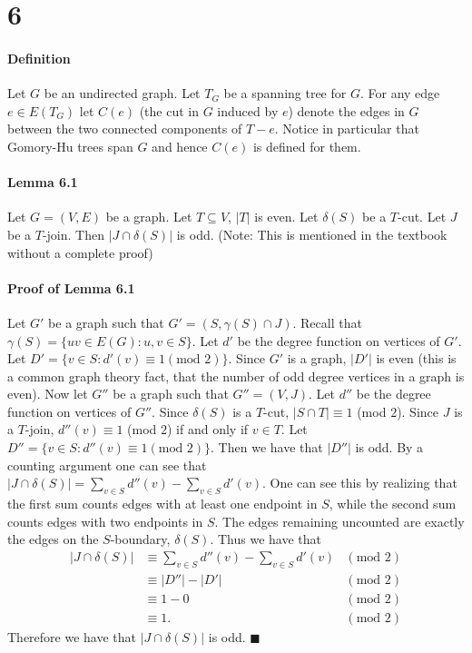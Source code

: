 \documentclass[letterpaper,12pt,oneside,onecolumn]{article}
\begin{document}
\section*{6}
\paragraph{Definition}
Let $G$ be an undirected graph. Let $T_G$ be a spanning tree for $G$.  For any edge $e \in E(T_G)$ let $C(e)$ (the cut in $G$ induced by $e$) denote the edges in $G$ between the two connected components of $T-e$. Notice in particular that Gomory-Hu trees span $G$ and hence $C(e)$ is defined for them.
\paragraph{Lemma 6.1}
Let $G=(V,E)$ be a graph. Let $T \subseteq V$, $|T|$ is even. Let $\delta(S)$ be a $T$-cut. Let $J$ be a $T$-join. Then $|J \cap \delta(S)|$ is odd. (Note: This is mentioned in the textbook without a complete proof)
\paragraph{Proof of Lemma 6.1}
Let $G'$ be a graph such that $G' = (S, \gamma(S) \cap J)$. Recall that $\gamma(S) = \{ uv \in E(G) : u, v \in S\}$. Let $d'$ be the degree function on vertices of $G'$. Let $D' = \{ v \in S : d'(v) \equiv 1 (\text{mod }2)\}$. Since $G'$ is a graph, $|D'|$ is even (this is a common graph theory fact, that the number of odd degree vertices in a graph is even). Now let $G''$ be a graph such that $G'' = (V, J)$. Let $d''$ be the degree function on vertices of $G''$. Since $\delta(S)$ is a $T$-cut, $|S \cap T| \equiv 1$ (mod $2$). Since $J$ is a $T$-join, $d''(v) \equiv 1$ (mod $2$) if and only if $v \in T$. Let $D'' = \{v \in S : d''(v) \equiv 1 (\text{mod }2)\}$. Then we have that $|D''|$ is odd. By a counting argument one can see that $|J \cap \delta(S)| = \sum_{v \in S} d''(v) - \sum_{v \in S} d'(v)$. One can see this by realizing that the first sum counts edges with at least one endpoint in $S$, while the second sum counts edges with two endpoints in $S$. The edges remaining uncounted are exactly the edges on the $S$-boundary, $\delta(S)$. Thus we have that
\begin{align*}
|J \cap \delta(S)| &\equiv \sum_{v \in S} d''(v) - \sum_{v \in S} d'(v) &(\text{mod }2)\\
&\equiv |D''| - |D'| &(\text{mod }2)\\
&\equiv 1 - 0 &(\text{mod }2)\\
&\equiv 1. &(\text{mod }2)
\end{align*}
Therefore we have that $|J \cap \delta(S)|$ is odd. $\blacksquare$
\end{document}
